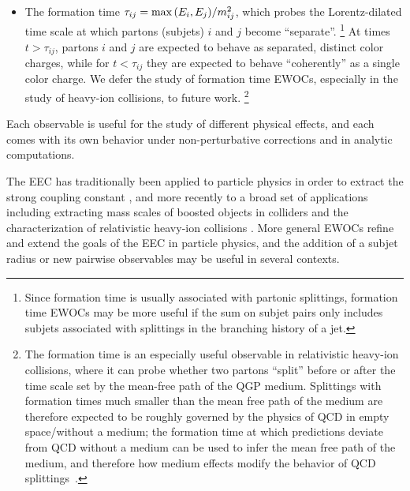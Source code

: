 \begin{itemize}
    \item
        The formation time \(\tau_{ij} = \max{\left(E_i, E_j\right)} / m^2_{ij}\), which probes the Lorentz-dilated time scale at which partons (subjets) \(i\) and \(j\)  become ``separate''.%
        \footnote{
            Since formation time is usually associated with partonic splittings, formation time EWOCs may be more useful if the sum on subjet pairs only includes subjets associated with splittings in the branching history of a jet.
        }
        At times  \(t > \tau_{ij}\), partons \(i\) and \(j\) are expected to behave as separated, distinct color charges, while for \(t < \tau_{ij}\) they are expected to behave ``coherently'' as a single color charge.
        We defer the study of formation time EWOCs, especially in the study of heavy-ion collisions, to future work.%
        \footnote{
            The formation time is an especially useful observable in relativistic heavy-ion collisions, where it can probe whether two partons ``split'' before or after the time scale set by the mean-free path of the QGP medium.
            Splittings with formation times much smaller than the mean free path of the medium are therefore expected to be roughly governed by the physics of QCD in empty space/without a medium;
            the formation time at which predictions deviate from QCD without a medium can be used to infer the mean free path of the medium, and therefore how medium effects modify the behavior of QCD splittings~\cite{Gyulassy:1993hr,Baier:1994bd,Zakharov:1996fv,Baier:1996sk,Baier:1996kr,Zakharov:1997uu,Wiedemann:2000ez,Wiedemann:2000za,Gyulassy:2000er,Wang:2001ifa,Kovner:2003zj,Borghini:2005em,Armesto:2007dt,Ovanesyan:2011xy,Ovanesyan:2011kn,Blaizot:2012fh,Fickinger:2013xwa,Apolinario:2014csa,Attems:2022ubu}.
        }
\end{itemize}
%
Each observable is useful for the study of different physical effects, and each comes with its own behavior under non-perturbative corrections and in analytic computations.

The EEC has traditionally been applied to particle physics in order to extract the strong coupling constant \cite{Martin:1986uq,DELPHI:1990sof,SLD:1994yoe,ATLAS:2015yaa,ATLAS:2017qir,dEnterria:2018cye,Kardos:2018kqj,Ali:2020ksn,dEnterria:2022hzv,Komiske:2022enw,ATLAS:2023tgo,CMS:2024mlf}, and more recently to a broad set of applications including extracting mass scales of boosted objects in colliders \cite{Procura:2022fid,Holguin:2022epo,Holguin:2023bjf,Pathak:2023tmy,Xiao:2024rol,Holguin:2024tkz} and the characterization of relativistic heavy-ion collisions \cite{Lokhtin:2004tx,Lokhtin:2006dp,Andres:2022ovj,Barata:2023zqg,Andres:2023xwr,Yang:2023dwc,Barata:2023vnl,Barata:2023bhh,Barata:2024nqo}.
%
More general EWOCs refine and extend the goals of the EEC in particle physics, and the addition of a subjet radius or new pairwise observables may be useful in several contexts.


